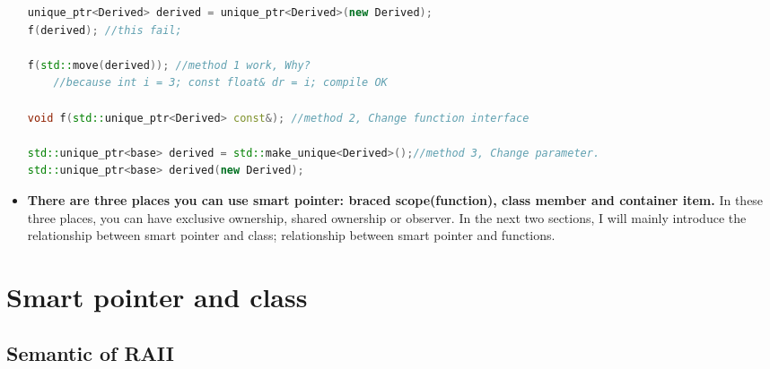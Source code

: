 \documentclass[a4paper,11pt,twoside]{book}
\begin{document}
\begin{itemize}
\begin{lstlisting}[frame=single, language=c++, mathescape=true]
unique_ptr<Derived> derived = unique_ptr<Derived>(new Derived);
f(derived); //this fail;

f(std::move(derived)); //method 1 work, Why?
    //because int i = 3; const float& dr = i; compile OK
                       
void f(std::unique_ptr<Derived> const&); //method 2, Change function interface

std::unique_ptr<base> derived = std::make_unique<Derived>();//method 3, Change parameter.
std::unique_ptr<base> derived(new Derived);
\end{lstlisting}


\item \textbf{There are three places you can use smart pointer: braced scope(function), class member and container item.} In these three places, you can have exclusive ownership, shared ownership or observer. In the next two sections, I will mainly introduce the relationship between smart pointer and class; relationship between smart pointer and functions.

\end{itemize}


\section{Smart pointer and class}
\subsection{Semantic of RAII}
\end{document}
